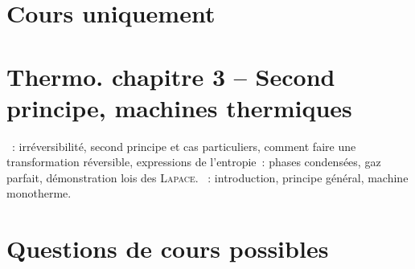\documentclass[a4paper, 12pt, final, garamond]{book}
\begin{document}
\section{Cours uniquement}
\section*{Thermo. chapitre 3 -- Second principe, machines thermiques}
\begin{enumerate}[label=\Roman*]
  ~: irréversibilité, second principe et cas particuliers,
    comment faire une transformation réversible, expressions de l'entropie~:
    phases condensées, gaz parfait, démonstration lois des \textsc{Lapace}.
  ~: introduction, principe général, machine
    monotherme.
\end{enumerate}

\section{Questions de cours possibles}
\end{document}
